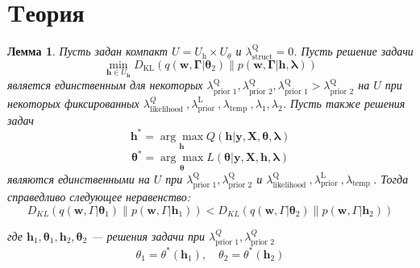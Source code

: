\documentclass[12pt]{article}
\newtheorem{lemma}[theorem]{Лемма}
\numberwithin{equation}{section}
\begin{document}
	\section*{Tеория}
	\begin{lemma}
Пусть задан компакт $U=U_{\mathrm{h}} \times U_{\theta}$ и $\lambda_{\mathrm{struct}}^{\mathrm{Q}}=0$. Пусть решение задачи $$\min _{\mathbf{h} \in U_{\mathbf{h}}} D_{\mathrm{KL}}\left(q\left(\mathbf{w}, \mathbf{\Gamma} | \boldsymbol{\theta}_{2}\right) \| p(\mathbf{w}, \mathbf{\Gamma} | \mathbf{h}, \boldsymbol{\lambda})\right)$$
является единственным для некоторых $\lambda_{\text {prior } 1}^{\mathrm{Q}}, \lambda_{\text {prior } 2}^{\mathrm{Q}}, \lambda_{\text {prior } 1}^{\mathrm{Q}}>\lambda_{\text {prior } 2}^{\mathrm{Q}}$ на $U$ при некоторых фиксированных $\lambda_{\text {likelihood }}^{Q}, \lambda_{\text {prior }}^{\mathrm{L}}, \lambda_{\text {temp }}, \lambda_{1}, \lambda_{2}$.
Пусть также решения задач
$$\mathbf{h}^{*}=\underset{\mathbf{h}}{\arg \max } Q(\mathbf{h} | \mathbf{y}, \mathbf{X}, \boldsymbol{\theta}, \boldsymbol{\lambda})$$
$$\boldsymbol{\theta}^{*}=\underset{\boldsymbol{\theta}}{\arg \max } L(\boldsymbol{\theta} | \mathbf{y}, \mathbf{X}, \mathbf{h}, \boldsymbol{\lambda})$$
являются единственными на $U$ при $\lambda_{\text {prior } 1}^{\mathrm{Q}}, \lambda_{\text {prior } 2}^{\mathrm{Q}}$ и $\lambda_{\text {likelihood }}^{\mathrm{Q}}, \lambda_{\text {prior }}^{\mathrm{L}}, \lambda_{\text {temp }}$. Тогда справедливо следующее неравенство:
$$ D_{K L}\left(q\left(\mathbf{w}, \Gamma | \boldsymbol{\theta}_{1}\right) \| p\left(\mathbf{w}, \Gamma | \mathbf{h}_{1}\right)\right)<D_{K L}\left(q\left(\mathbf{w}, \Gamma | \boldsymbol{\theta}_{2}\right) \| p\left(\mathbf{w}, \Gamma | \mathbf{h}_{2}\right)\right)$$

где $\mathbf{h}_{1}, \boldsymbol{\theta}_{1}, \mathbf{h}_{2}, \boldsymbol{\theta}_{2}$ ---  решения задачи при
$\lambda_{\text {prior } 1}^{Q}, \lambda_{\text {prior } 2}^{Q}$
$$\theta_{1}=\theta^{*}\left(\mathbf{h}_{1}\right), \quad \theta_{2}=\theta^{*}\left(\mathbf{h}_{2}\right)$$
\end{lemma}	
	
\end{document}
